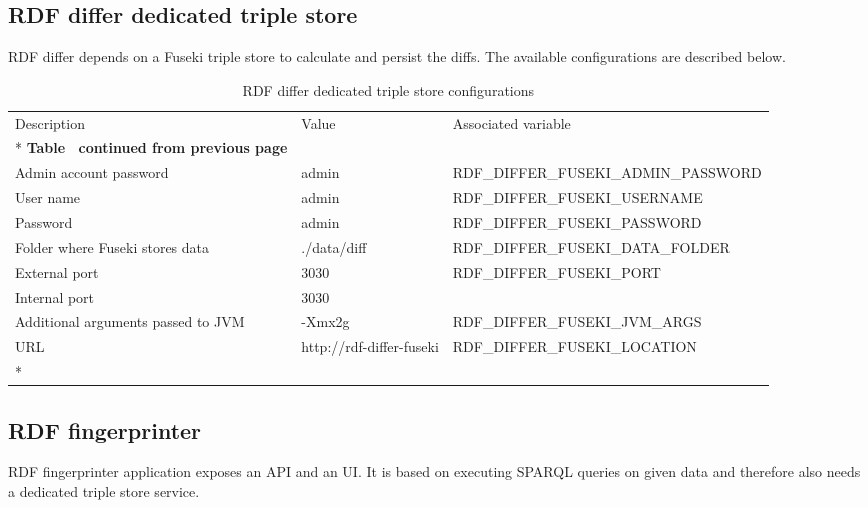 	\subsection{RDF differ dedicated triple store}
	
	RDF differ depends on a Fuseki triple store to calculate and persist the diffs. The available configurations are described below. 

	\begin{longtable}[c]{@{}p{4cm}p{2cm}l@{}}
		\toprule
		Description & Value & Associated variable \\* \midrule
		\endfirsthead
		\multicolumn{3}{c}%
		{{\bfseries Table \thetable\ continued from previous page}} \\
		\endhead
		\bottomrule
		\endfoot
		\endlastfoot
		Admin account password & admin & RDF\_DIFFER\_FUSEKI\_ADMIN\_PASSWORD \\
		User name & admin & RDF\_DIFFER\_FUSEKI\_USERNAME \\
		Password & admin & RDF\_DIFFER\_FUSEKI\_PASSWORD \\
		Folder where Fuseki stores data & ./data/diff & RDF\_DIFFER\_FUSEKI\_DATA\_FOLDER \\
		External port & 3030 & RDF\_DIFFER\_FUSEKI\_PORT \\
		Internal port & 3030 &  \\
		Additional arguments passed to JVM & -Xmx2g & RDF\_DIFFER\_FUSEKI\_JVM\_ARGS \\
		URL & http://rdf-differ-fuseki & RDF\_DIFFER\_FUSEKI\_LOCATION \\* \bottomrule
		\caption{RDF differ dedicated triple store configurations}
		\label{tab:my-table2}\\
	\end{longtable}
	
	\subsection{RDF fingerprinter}
	
	RDF fingerprinter application exposes an API and an UI. It is based on executing SPARQL queries on given data and therefore also needs a dedicated triple store service. 

